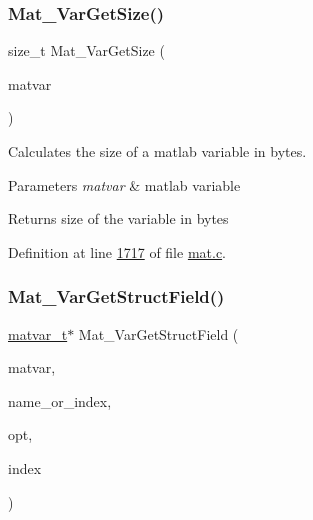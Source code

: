\mbox{\label{group___m_a_t_gaeeb798fead2f765bddfb19016c7fdbcc}} 
\subsubsection{\texorpdfstring{Mat\+\_\+\+Var\+Get\+Size()}{Mat\_VarGetSize()}}
{\footnotesize\ttfamily size\+\_\+t Mat\+\_\+\+Var\+Get\+Size (\begin{DoxyParamCaption}\item[{\hyperlink{group___m_a_t_structmatvar__t}{matvar\+\_\+t} $\ast$}]{matvar }\end{DoxyParamCaption})}



Calculates the size of a matlab variable in bytes. 


\begin{DoxyParams}{Parameters}
{\em matvar} & matlab variable \\
\hline
\end{DoxyParams}
\begin{DoxyReturn}{Returns}
size of the variable in bytes 
\end{DoxyReturn}


Definition at line \hyperlink{mat_8c_source_l01717}{1717} of file \hyperlink{mat_8c_source}{mat.\+c}.

\mbox{\label{group___m_a_t_ga7018bfe6934b96ae32e8f2a1712eefab}} 
\subsubsection{\texorpdfstring{Mat\+\_\+\+Var\+Get\+Struct\+Field()}{Mat\_VarGetStructField()}}
{\footnotesize\ttfamily \hyperlink{group___m_a_t_structmatvar__t}{matvar\+\_\+t}$\ast$ Mat\+\_\+\+Var\+Get\+Struct\+Field (\begin{DoxyParamCaption}\item[{\hyperlink{group___m_a_t_structmatvar__t}{matvar\+\_\+t} $\ast$}]{matvar,  }\item[{void $\ast$}]{name\+\_\+or\+\_\+index,  }\item[{int}]{opt,  }\item[{int}]{index }\end{DoxyParamCaption})}



